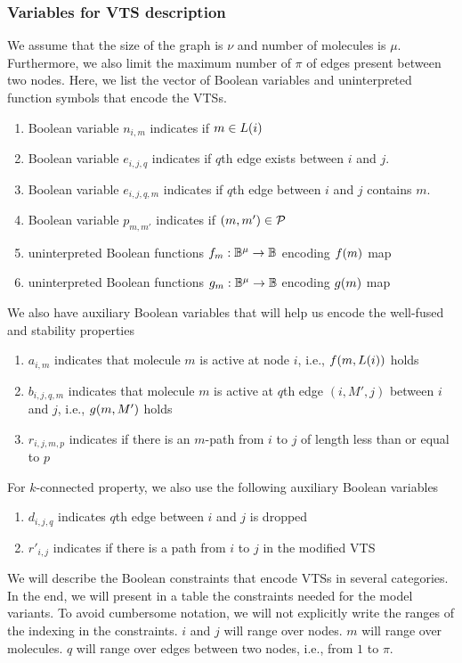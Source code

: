 \subsubsection{Variables for VTS description}
%
We assume that the size of the graph is $\nu$ and number of molecules is
$\mu$.
%
Furthermore, we also limit the maximum number of $\pi$ of edges present
between two nodes.
%
Here, we list the vector of Boolean variables and uninterpreted function symbols that encode the VTSs.
\begin{enumerate}

\item Boolean variable $n_{i,m}$ indicates if $m \in L(i)$
\item Boolean variable $e_{i,j,q}$ indicates if $q$th edge exists between $i$ and $j$.
\item Boolean variable $e_{i,j,q,m}$ indicates if $q$th edge between $i$ and $j$ contains $m$.
\item Boolean variable $p_{m,m'}$ indicates if $(m,m') \in \mathcal{P}$
\item uninterpreted Boolean functions $f_m : \mathbb{B}^\mu \rightarrow \mathbb{B}$
encoding $f(m)$ map
\item uninterpreted Boolean functions $g_m : \mathbb{B}^\mu \rightarrow \mathbb{B}$
encoding $g(m)$ map
\end{enumerate}
We also have auxiliary Boolean variables that will help us encode the well-fused and stability properties 
\begin{enumerate}
\item $a_{i,m}$ indicates that molecule $m$ is active at node $i$, i.e., $f(m,L(i))$
  holds
\item $b_{i,j,q,m}$ indicates that molecule $m$ is active at $q$th edge $(i,M',j)$ between $i$ and $j$, i.e., $g(m,M')$ holds
\item $r_{i,j,m,p}$ indicates if there is an $m$-path from
  $i$ to $j$ of length less than or equal to $p$
\end{enumerate}
For $k$-connected property, we also use the following auxiliary Boolean variables
\begin{enumerate}
\item $d_{i,j,q}$ indicates $q$th edge between $i$ and $j$ is dropped
\item $r'_{i,j}$ indicates if there is a path from $i$ to $j$ in the modified VTS
\end{enumerate}

We will describe the Boolean constraints that encode VTSs in several categories.
%
In the end, we will present in a table the constraints needed for the
model variants.
%
To avoid cumbersome notation, we will not explicitly write the ranges of the indexing
in the constraints.
%
$i$ and $j$ will range over nodes.
%
$m$ will range over molecules.
%
$q$ will range over edges between two nodes, i.e., from $1$ to $\pi$.
%

